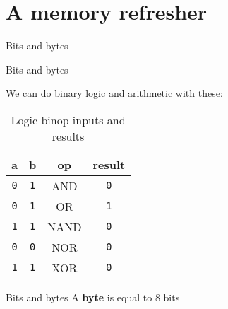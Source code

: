 \documentclass[../index.tex]{subfiles}
\begin{document}
\renewcommand{\sectiontitle}{A memory refresher}
\section{\sectiontitle}

\renewcommand{\currenttitle}{Bits and bytes}
\begin{frame}{\currenttitle}
%
   \\
\end{frame}

\begin{frame}{\currenttitle}
  \newcommand{\false}{\texttt{0}}
  \newcommand{\true}{\texttt{1}}

  We can do binary logic and arithmetic with these:

  \begin{table}
    \begin{tabular}{c c c c}
      a & b & op & result \\
      \hline{}
      \false{} & \true{} & AND & \false{} \\
      \false{} & \true{} & OR & \true{} \\
      \true{} & \true{} & NAND & \false{} \\
      \false{} & \false{} & NOR & \false{} \\
      \true{} & \true{} & XOR & \false{}
    \end{tabular}
    \caption{Logic binop inputs and results}
  \end{table}
\end{frame}

\begin{frame}{\currenttitle}
  A \textbf{byte} is equal to 8 bits \\
\end{frame}
\end{document}
